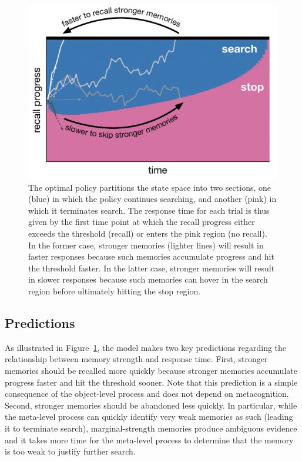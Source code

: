 \begin{figure}[ht]
  \centering
  \includegraphics[scale=0.45]{figs/memory/exp1_predictions.pdf}
  \caption{
    The optimal policy partitions the state space into two sections, one (blue) in which the policy continues searching, and another (pink) in which it terminates search. The response time for each trial is thus given by the first time point at which the recall progress either exceeds the threshold (recall) or enters the pink region (no recall). In the former case, stronger memories (lighter lines) will result in faster responses because such memories accumulate progress and hit the threshold faster. In the latter case, stronger memories will result in slower responses because such memories can hover in the search region before ultimately hitting the stop region.
  }
  \label{fig:exp1_predictions}
\end{figure}

\subsection{Predictions}

As illustrated in Figure~\ref{fig:exp1_predictions}, the model makes two key predictions regarding the relationship between memory strength and response time. First, stronger memories should be recalled more quickly because stronger memories accumulate progress faster and hit the threshold sooner. Note that this prediction is a simple consequence of the object-level process and does not depend on metacognition. Second, stronger memories should be abandoned less quickly. In particular, while the meta-level process can quickly identify very weak memories as such (leading it to terminate search), marginal-strength memories produce ambiguous evidence and it takes more time for the meta-level process to determine that the memory is too weak to justify further search.

